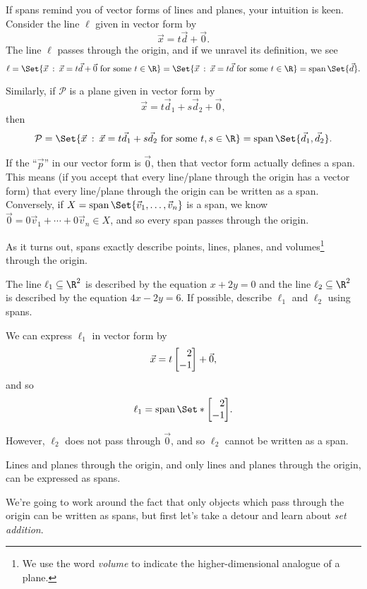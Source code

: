 
If spans remind you of vector forms of lines and planes, your intuition is keen.
Consider the line $\ell$ given in vector form by
\[
	\vec x=t\vec d+\vec 0.
\]
The line $\ell$ passes through the origin, and if we unravel its definition, we see
\[
	\ell=\Set{\vec x\given \vec x=t\vec d+\vec 0\text{ for some }t\in \R}
	=\Set{\vec x\given \vec x=t\vec d\text{ for some }t\in \R}=\Span\Set{\vec d}.
\]

Similarly, if $\mathcal P$ is a plane given in vector form by
\[
	\vec x=t\vec d_1+s\vec d_2+\vec 0,
\]
then
\[
	\mathcal P=
	\Set{\vec x\given \vec x=t\vec d_1+s\vec d_2\text{ for some }t,s\in \R}=\Span\Set{\vec d_1,\vec d_2}.
\]

If the ``$\vec p$'' in our vector form is $\vec 0$, then that vector form actually defines
a span. This means (if you accept that every line/plane through the origin has a
vector form) that every line/plane through the origin can be written as a span. Conversely,
if $X=\Span\Set{\vec v_1,\ldots,\vec v_n}$ is a span, we know $\vec 0=0\vec v_1+\cdots+0\vec v_n\in X$,
and so every span passes through the origin.


As it turns out, spans exactly describe points, lines, planes, and volumes\footnote{
 We use the word \emph{volume} to indicate the higher-dimensional analogue of a plane.} through the origin.

\begin{example}
	The line $\ell_1\subseteq\R^2$ is described by the equation $x+2y=0$ and the line 
	$\ell_2\subseteq \R^2$ is described by the equation $4x-2y=6$.
	If possible, describe $\ell_1$ and $\ell_2$ using spans.

	We can express $\ell_1$ in vector form by
	\[
		\vec x=t\mat{2\\-1}+\vec 0,
	\]
	and so 
	\[
		\ell_1=\Span\Set*{\mat{2\\-1}}.
	\]

	However, $\ell_2$ does not pass through $\vec 0$, and so $\ell_2$ cannot be written as a span.
\end{example}

\begin{emphbox}[Takeaway]
	Lines and planes through the origin, and only lines and planes through the origin, can be expressed as spans.
\end{emphbox}

We're going to work around the fact that only objects which pass through the origin can be written as
spans, but first let's take a detour and learn about \emph{set addition}.

